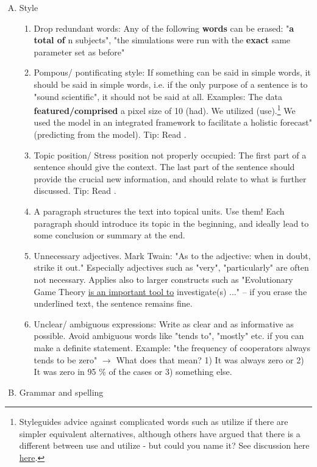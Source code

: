 \documentclass{tufte-book}
\begin{document}
\begin{enumerate}[(A)]
\item Style
\begin{enumerate}
	\item Drop redundant words: Any of the following \textbf{words} can be erased: "\textbf{a total of} n subjects", "the simulations were run with the \textbf{exact} same parameter set as before"
	\item Pompous/ pontificating style: If something can be said in simple words, it should be said in simple words, i.e. if the only purpose of a sentence is to "sound scientific", it should not be said at all. Examples: The data \textbf{featured/comprised} a pixel size of 10 (had). We utilized (use).\footnote{Styleguides advice against complicated words such as utilize if there are simpler equivalent alternatives, although others have argued that there is a different between use and utilize - but could you name it? See discussion here \href{http://en.wiktionary.org/wiki/utilise}{here}.} We used the model in an integrated framework to facilitate a holistic forecast" (predicting from the model). Tip: Read \citet{Woodford-Sounderthinkingthrough-1967}.
	\item Topic position/ Stress position not properly occupied: The first part of a sentence should give the context. The last part of the sentence should provide the crucial new information, and should relate to what is further discussed. Tip: Read \citet{Gopen-ScienceOfScientific-1990}.
	\item A paragraph structures the text into topical units. Use them! Each paragraph should introduce its topic in the beginning, and ideally lead to some conclusion or summary at the end. 
	\item Unnecessary adjectives. Mark Twain: "As to the adjective: when in doubt, strike it out." Especially adjectives such as "very", "particularly" are often not necessary. Applies also to larger constructs such as "Evolutionary Game Theory \uline{is an important tool to} investigate(s) ..." -- if you erase the underlined text, the sentence remains fine.
	\item Unclear/ ambiguous expressions: Write as clear and as informative as possible. Avoid ambiguous words like "tends to", "mostly" etc. if you can make a definite statement. Example: "the frequency of cooperators always tends to be zero"  $\rightarrow$ What does that mean? 1) It was always zero or 2) It was zero in 95 \% of the cases or 3) something else.
\end{enumerate}

\item Grammar and spelling


\end{enumerate}
\end{document}
